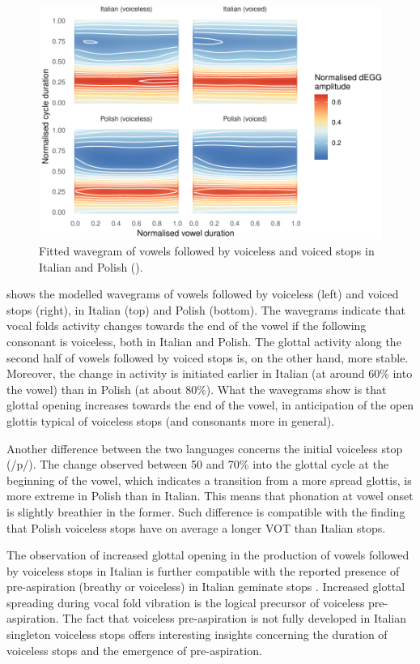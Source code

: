 \documentclass[12pt,a4paper,]{article}
\begin{document}
\begin{figure}
\includegraphics[width=\linewidth]{2019-wavegram_files/figure-latex/surface-1} \caption{Fitted wavegram of vowels followed by voiceless and voiced stops in Italian and Polish ().}\label{f:surface}
\end{figure}

 shows the modelled wavegrams of vowels followed by
voiceless (left) and voiced stops (right), in Italian (top) and Polish
(bottom). The wavegrams indicate that vocal folds activity changes
towards the end of the vowel if the following consonant is voiceless,
both in Italian and Polish. The glottal activity along the second half
of vowels followed by voiced stops is, on the other hand, more stable.
Moreover, the change in activity is initiated earlier in Italian (at
around 60\% into the vowel) than in Polish (at about 80\%). What the
wavegrams show is that glottal opening increases towards the end of the
vowel, in anticipation of the open glottis typical of voiceless stops
(and consonants more in general).

Another difference between the two languages concerns the initial
voiceless stop (/p/). The change observed between 50 and 70\% into the
glottal cycle at the beginning of the vowel, which indicates a
transition from a more spread glottis, is more extreme in Polish than in
Italian. This means that phonation at vowel onset is slightly breathier
in the former. Such difference is compatible with the finding that
Polish voiceless stops have on average a longer VOT than Italian stops.

The observation of increased glottal opening in the production of vowels
followed by voiceless stops in Italian is further compatible with the
reported presence of pre-aspiration (breathy or voiceless) in Italian
geminate stops
\citep{stevens2004, stevens2004a, stevens2010, stevens2010b, stevens2014a}.
Increased glottal spreading during vocal fold vibration is the logical
precursor of voiceless pre-aspiration. The fact that voiceless
pre-aspiration is not fully developed in Italian singleton voiceless
stops offers interesting insights concerning the duration of voiceless
stops and the emergence of pre-aspiration.
\end{document}
